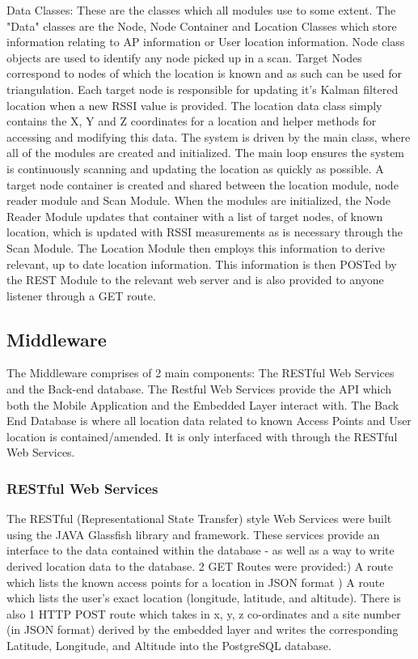 \documentclass[conference]{IEEEtran}
\begin{document}
Data Classes: These are the classes which all modules use to some extent. The "Data" classes are the Node, Node Container and Location Classes which store information relating to AP information or User location information. Node class objects are used to identify any node picked up in a scan. Target Nodes correspond to nodes of which the location is known and as such can be used for triangulation. Each target node is responsible for updating it's Kalman filtered location when a new RSSI value is provided. The location data class simply contains the X, Y and Z coordinates for a location and helper methods for accessing and modifying this data. 
\newline
The system is driven by the main class, where all of the modules are created and initialized. The main loop ensures the system is continuously scanning and updating the location as quickly as possible. A target node container is created and shared between the location module, node reader module and Scan Module. When the modules are initialized, the Node Reader Module updates that container with a list of target nodes, of known location, which is updated with RSSI measurements as is necessary through the Scan Module. The Location Module then employs this information to derive relevant, up to date location information. This information is then POSTed by the REST Module to the relevant web server and is also provided to anyone listener through a GET route.

\subsection{Middleware}
The Middleware comprises of 2 main components:\newline
The RESTful Web Services and the Back-end database. The Restful Web Services provide the API which both the Mobile Application and the Embedded Layer interact with. The Back End Database is where all location data related to known Access Points and User location is contained/amended. It is only interfaced with through the RESTful Web Services.
\newline
\subsubsection{RESTful Web Services}
The RESTful (Representational State Transfer) style Web Services were built using the JAVA Glassfish library and framework. These services  provide an interface to the data contained within the database - as well as a way to write derived location data to the database. 2 GET Routes were provided:) A route which lists the known access points for a location in JSON format ) A route which lists the user's exact location (longitude, latitude, and altitude).
\newline
There is also 1 HTTP POST route which takes in x, y, z co-ordinates and a site number (in JSON format) derived by the embedded layer and writes the corresponding Latitude, Longitude, and Altitude into the PostgreSQL database.
\newline
\end{document}
